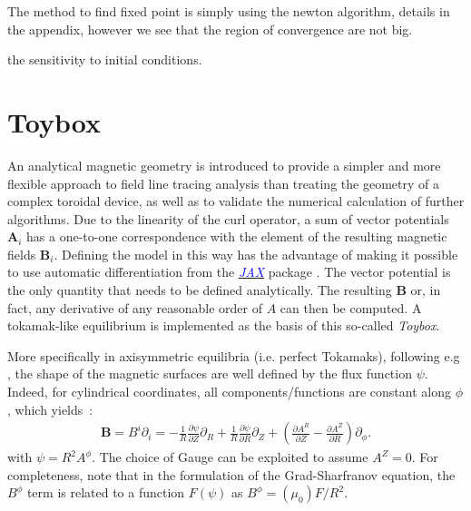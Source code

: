 The method to find fixed point is simply using the newton algorithm, details in the appendix, however we see that the region of convergence are not big.

\begin{figure}[H]
    \hfill
    \caption{}
\end{figure}

the sensitivity to initial conditions.

\chapter{Toybox}
An analytical magnetic geometry is introduced to provide a simpler and more flexible approach to field line tracing analysis than treating the geometry of a complex toroidal device, as well as to validate the numerical calculation of further algorithms. Due to the linearity of the curl operator, a sum of vector potentials $\textbf{A}_i$ has a one-to-one correspondence with the element of the resulting magnetic fields $\textbf{B}_i$. Defining the model in this way has the advantage of making it possible to use automatic differentiation from the 
\href{https://jax.readthedocs.io/en/latest/index.html}{\textcolor{blue}{\textit{JAX}}}
package \cite{bradbury_jax_2018}. The vector potential is the only quantity that needs to be defined analytically. The resulting $\textbf{B}$ or, in fact, any derivative of any reasonable order of $A$ can then be computed. A tokamak-like equilibrium is implemented as the basis of this so-called \textit{Toybox}.

More specifically in axisymmetric equilibria (i.e. perfect Tokamaks), following e.g \cite[p.108]{wesson_tokamaks_2011}, the shape of the magnetic surfaces are well defined by the flux function  $\psi$. Indeed, for cylindrical coordinates, all components/functions are constant along $\phi$, which yields~:
\begin{align*}
    \textbf{B} = B^i\partial_i = -\frac{1}{R}\frac{\partial\psi}{\partial Z}\partial_R +\frac{1}{R}\frac{\partial\psi}{\partial R}\partial_Z + \left(\frac{\partial A^R}{\partial Z} - \frac{\partial A^Z}{\partial R}\right)\partial_\phi.
\end{align*}
with $\psi = R^2 A^\phi$. The choice of Gauge can be exploited to assume $A^Z = 0$. For completeness, note that in the formulation of the Grad-Sharfranov equation, the $B^\phi$ term is related to a function $F(\psi)$ as $B^\phi = (\mu_0) F/R^2$.

